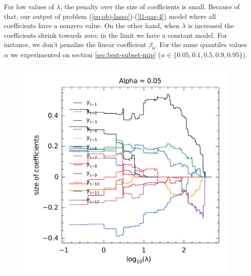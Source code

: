 For low values of $\lambda$, the penalty over the size of coefficients is small. Because of that, our output of problem (\ref{eq:obj-lasso})-(\ref{l1-qar-4}) model where all coefficients have a nonzero value. On the other hand, when $\lambda$ is increased the coefficients shrink towards zero; in the limit we have a constant model. For instance, we don't penalize the linear coefficient $\beta_0$. For the same quantiles values $\alpha$ we experimented on section \ref{sec:best-subset-mip} ($\alpha \in \{0.05, 0.1, 0.5, 0.9, 0.95\}$). 

\begin{figure}
	\centering
	\begin{minipage}[t]{0.4\linewidth}
		\centering
		\begin{minipage}[t]{\linewidth}
			\centering     \includegraphics[width=\textwidth]{Figuras/selecao-lasso/par-sellasso-005.pdf}
		\end{minipage}
		\begin{minipage}[b]{\linewidth}

\end{minipage}
\end{minipage}
\end{figure}
